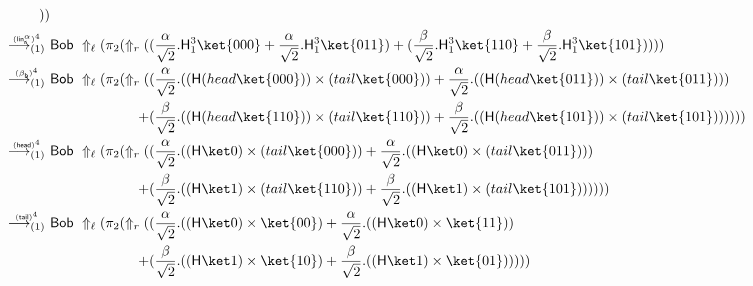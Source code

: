 \documentclass[preprint]{elsarticle}
\newcommand\lra[1][1]{\longrightarrow_{\left(#1\right)}}
\newcommand\pair[2]{({#1}+{#2})}
\newcommand\s[1]{\ensuremath{\mathsf{#1}}}
\newcommand\red[2][1]{\overset{\scriptscriptstyle\smash{#2}\vphantom{x}}{\lra[#1]}\ }
\newcommand\rbetab{(\s{\beta_b})}
\newcommand\rlinscalr{(\s{lin^\alpha_r})}
\newcommand\rhead{(\s{head})}
\newcommand\rtail{(\s{tail})}
\begin{document}
\begin{align*}
                   ))
  \\
  \red{\rlinscalr^4} &
                       \s{Bob}\ \Uparrow_\ell(\pi_2(\Uparrow_r
                       \pair
                       {\pair{\frac{\alpha}{\sqrt 2}.\s H_1^3\ket{000}}{\frac{\alpha}{\sqrt 2}.\s H_1^3\ket{011}}}
                       {\pair{\frac{\beta}{\sqrt 2}.\s H_1^3\ket{110}}{\frac{\beta}{\sqrt 2}.\s H_1^3\ket{101}}}
                       ))
  \\
  \red{\rbetab^4} &
                    \begin{aligned}[t]
                      \s{Bob}\ \Uparrow_\ell(\pi_2(\Uparrow_r  ( &\pair
                      {\frac{\alpha}{\sqrt 2}.((\s H(head
                        \ket{000}))\times(tail \ket{000}))}
                      {\frac{\alpha}{\sqrt 2}.((\s H(head
                        \ket{011}))\times(tail \ket{011}))}
                      \\
                      + &\pair {\frac{\beta}{\sqrt 2}.((\s H(head
                        \ket{110}))\times(tail \ket{110}))} {\frac{\beta}{\sqrt
                          2}.((\s H(head \ket{101}))\times(tail \ket{101}))} )
                      ))
                    \end{aligned}
  \\
  \red{\rhead^4} &
                   \begin{aligned}[t]
                     \s{Bob}\ \Uparrow_\ell(\pi_2(\Uparrow_r  ( &\pair
                     {\frac{\alpha}{\sqrt 2}.((\s H\ket 0)\times(tail
                       \ket{000}))} {\frac{\alpha}{\sqrt 2}.((\s H\ket
                       0)\times(tail \ket{011}))}
                     \\
                     + &\pair {\frac{\beta}{\sqrt 2}.((\s H\ket 1)\times(tail
                       \ket{110}))} {\frac{\beta}{\sqrt 2}.((\s H\ket
                       1)\times(tail \ket{101}))} ) ))
                   \end{aligned}
  \\
  \red{\rtail^4} &
                   \begin{aligned}[t]
                     \s{Bob}\ \Uparrow_\ell(\pi_2(\Uparrow_r  ( &\pair
                     {\frac{\alpha}{\sqrt 2}.((\s H\ket 0)\times\ket{00})}
                     {\frac{\alpha}{\sqrt 2}.((\s H\ket 0)\times\ket{11})}
                     \\
                     + &\pair {\frac{\beta}{\sqrt 2}.((\s H\ket
                       1)\times\ket{10})} {\frac{\beta}{\sqrt 2}.((\s H\ket
                       1)\times\ket{01})} ) ) )

\end{aligned}
\end{align*}
\end{document}

